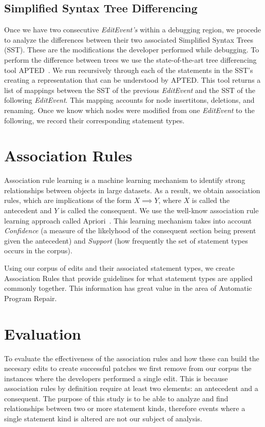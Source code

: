 \documentclass[sigconf]{acmart}
\begin{document}
\subsection{Simplified Syntax Tree Differencing}
\label{sstDiff}
Once we have two consecutive \textit{EditEvent's} within
a debugging region, we procede to analyze the differences
between their two associated Simplified Syntax Trees (SST).
These are the modifications the developer performed
while debugging.
To perform the difference between trees we use the 
state-of-the-art tree differencing
tool APTED~\cite{Pawlik16Apted}.
We run recursively through each of the statements in the 
SST's creating a representation that can be understood by
APTED. This tool returns a list of mappings between
the SST of the previous \textit{EditEvent} and the SST
of the following \textit{EditEvent}. This mapping
accounts for node insertitons, deletions, and renaming.
Once we know which nodes were modified from one \textit{EditEvent}
to the following, we record their corresponding statement types.

\section{Association Rules}
\label{assocRules}
Association rule learning is a machine learning mechanism to identify
strong relationships between objects in large datasets. 
As a result, we obtain association rules, which are implications of the
form $X \implies Y$, where $X$ is called the antecedent and 
$Y$ is called the consequent.
We use the well-know association rule learning approach called 
Apriori~\cite{Agrawal94}. This learning mechanism takes into 
account \textit{Confidence} (a measure of the likelyhood 
of the consequent section being present given the 
antecedent) and \textit{Support} (how frequently the set of
statement types occurs in the corpus).

Using our corpus of edits and their associated statement types, 
we create Association Rules that provide guidelines
for what statement types are applied commonly together. This
information has great value in the area of Automatic 
Program Repair.

\section{Evaluation}
\label{eval}

To evaluate the effectiveness
of the association rules and how these can build the
necesary edits to create successful patches we first
remove from our corpus the instances where the developers
performed a single edit. This is because association rules
by definition require at least two elements: an antecedent
and a consequent. The purpose of this study is to be able to
analyze and find relationships between two or more statement
kinds, therefore events where a single statement kind is altered
are not our subject of analysis.
\end{document}

